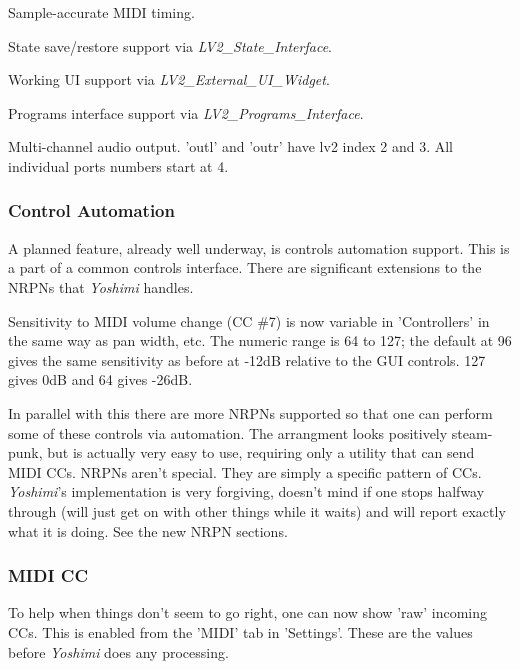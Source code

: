 \documentclass[
 11pt,
 twoside,
 a4paper,
 final                                 %
]{article}
\begin{document}
   \begin{enumber}
      \item Sample-accurate MIDI timing.
      \item State save/restore support via \textsl{LV2\_State\_Interface}.
      \item Working UI support via \textsl{LV2\_External\_UI\_Widget}.
      \item Programs interface support via \textsl{LV2\_Programs\_Interface}.
      \item Multi-channel audio output.
         'outl' and 'outr' have lv2 index 2 and 3.
         All individual ports numbers start at 4.
   \end{enumber}

\subsubsection{Control Automation}
\label{subsubsec:new_features_control_automation}

   A planned feature, already well underway, is
   controls automation support.
   This is a part of a common controls interface.
   There are significant extensions to the NRPNs that
   \textsl{Yoshimi} handles.  

   Sensitivity to MIDI volume change (CC \#7) is now variable in 'Controllers'
   in the same way as pan width, etc. The numeric range is 64 to 127; the
   default at 96 gives the same sensitivity as before at -12dB relative to the
   GUI controls.  127 gives 0dB and 64 gives -26dB.

   In parallel with this there are more NRPNs supported so that one can perform
   some of these controls via automation. The arrangment looks positively
   steam-punk, but is actually very easy to use, requiring only a utility that
   can send MIDI CCs.  NRPNs aren't special. They are simply a specific pattern
   of CCs.  \textsl{Yoshimi}'s implementation is very forgiving, doesn't mind
   if one stops halfway through (will just get on with other things while it
   waits) and will report exactly what it is doing.  See the new NRPN
   sections.

\subsubsection{MIDI CC}
\label{subsubsec:new_features_midi_cc}

   To help when things don't seem to go right, one can now show 'raw' incoming
   CCs. This is enabled from the 'MIDI' tab in 'Settings'. These are the values
   before \textsl{Yoshimi} does any processing.
\end{document}
